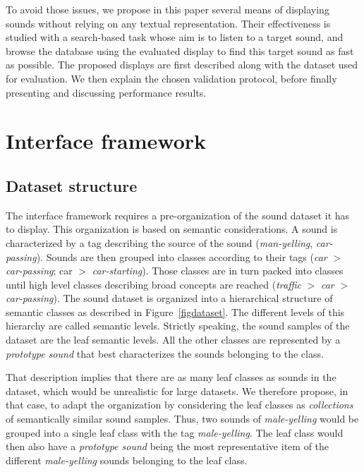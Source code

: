 \documentclass{aes2e}
\begin{document}
To avoid those issues, we propose in this paper several means of displaying sounds without relying on any textual representation. Their effectiveness is studied with a search-based task whose aim is to listen to a target sound, and browse the database using the evaluated display to find this target sound as fast as possible. The proposed displays are first described along with the dataset used for evaluation. We then explain the chosen validation protocol, before finally presenting and discussing performance results.

\section{Interface framework}

\subsection{Dataset structure}

The interface framework requires a pre-organization of the sound dataset it has to display. This organization is based on semantic considerations. A sound is characterized by a tag describing the source of the sound (\textit{man-yelling}, \textit{car-passing}). Sounds are then grouped into classes according to their tags (\textit{car} $>$ \textit{car-passing}; car $>$ \textit{car-starting}). Those classes are in turn  packed into classes until high level classes describing broad concepts are reached (\textit{traffic} $>$ \textit{car} $>$ \textit{car-passing}). The sound dataset is organized into a hierarchical structure of semantic classes as described in Figure~\ref{figdataset}. The different levels of this hierarchy are called semantic levels. Strictly speaking, the sound samples of the dataset are the leaf semantic levels. All the other classes are represented by a \textit{prototype sound} that best characterizes the sounds belonging to the class. 

That description implies that there are as many leaf classes as sounds in the dataset, which would be unrealistic for large datasets. We therefore propose, in that case, to adapt the organization by considering the leaf classes as \textit{collections} of semantically similar sound samples. Thus, two sounds of \textit{male-yelling} would be grouped into a  single leaf class with the tag \textit{male-yelling}. The leaf class would then also have a \textit{prototype sound} being the most representative item of the different \textit{male-yelling} sounds belonging to the leaf class.
\end{document}
